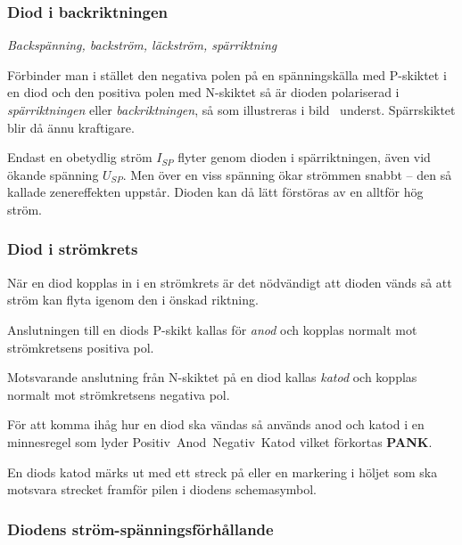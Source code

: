 \subsubsection{Diod i backriktningen}

\emph{Backspänning, backström, läckström, spärriktning}

Förbinder man i stället den negativa polen på en spänningskälla med P-skiktet i
en diod och den positiva polen med N-skiktet så är dioden polariserad i
\emph{spärriktningen} eller \emph{backriktningen}, så som illustreras i
bild~ underst.
Spärrskiktet blir då ännu kraftigare.

Endast en obetydlig ström \(I_{SP}\) flyter genom dioden i spärriktningen, även
vid ökande spänning \(U_{SP}\).
Men över en viss spänning ökar strömmen snabbt -- den så kallade zenereffekten
uppstår.
Dioden kan då lätt förstöras av en alltför hög ström.

\subsubsection{Diod i strömkrets}

När en diod kopplas in i en strömkrets är det nödvändigt att dioden vänds så att
ström kan flyta igenom den i önskad riktning.

Anslutningen till en diods P-skikt kallas för \emph{anod} och kopplas normalt
mot strömkretsens positiva pol.

Motsvarande anslutning från N-skiktet på en diod kallas \emph{katod} och kopplas
normalt mot strömkretsens negativa pol.

\newpage
För att komma ihåg hur en diod ska vändas så används anod och katod i en
minnesregel som lyder Positiv~Anod~Negativ~Katod vilket förkortas \textbf{PANK}.

En diods katod märks ut med ett streck på eller en markering i höljet som ska
motsvara strecket framför pilen i diodens schemasymbol.

\subsubsection{Diodens ström-spänningsförhållande}


